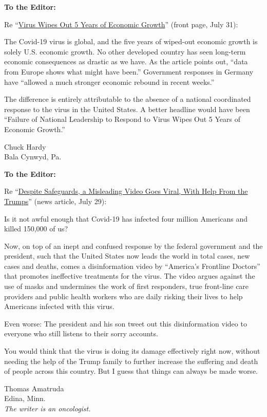 \textbf{To the Editor:}

Re
``\href{https://www.nytimes3xbfgragh.onion/2020/07/30/business/economy/q2-gdp-coronavirus-economy.html}{Virus
Wipes Out 5 Years of Economic Growth}'' (front page, July 31):

The Covid-19 virus is global, and the five years of wiped-out economic
growth is solely U.S. economic growth. No other developed country has
seen long-term economic consequences as drastic as we have. As the
article points out, ``data from Europe shows what might have been.''
Government responses in Germany have ``allowed a much stronger economic
rebound in recent weeks.''

The difference is entirely attributable to the absence of a national
coordinated response to the virus in the United States. A better
headline would have been ``Failure of National Leadership to Respond to
Virus Wipes Out 5 Years of Economic Growth.''

Chuck Hardy\\
Bala Cynwyd, Pa.

\textbf{To the Editor:}

Re
``\href{https://www.nytimes3xbfgragh.onion/2020/07/28/technology/virus-video-trump.html}{Despite
Safeguards, a Misleading Video Goes Viral, With Help From the Trumps}''
(news article, July 29):

Is it not awful enough that Covid-19 has infected four million Americans
and killed 150,000 of us?

Now, on top of an inept and confused response by the federal government
and the president, such that the United States now leads the world in
total cases, new cases and deaths, comes a disinformation video by
``America's Frontline Doctors'' that promotes ineffective treatments for
the virus. The video argues against the use of masks and undermines the
work of first responders, true front-line care providers and public
health workers who are daily risking their lives to help Americans
infected with this virus.

Even worse: The president and his son tweet out this disinformation
video to everyone who still listens to their sorry accounts.

You would think that the virus is doing its damage effectively right
now, without needing the help of the Trump family to further increase
the suffering and death of people across this country. But I guess that
things can always be made worse.

Thomas Amatruda\\
Edina, Minn.\\
\emph{The writer is an oncologist.}

